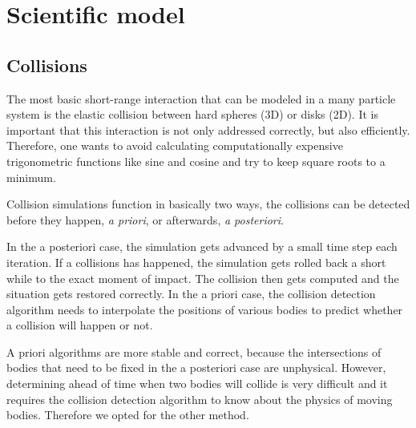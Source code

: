 \section{Scientific model}
\subsection{Collisions}

The most basic short-range interaction that can be modeled in a many 
particle system is the elastic collision between hard spheres (3D) or disks 
(2D). It is important that this interaction is not only addressed 
correctly, but also efficiently. Therefore, one wants to avoid calculating 
computationally expensive trigonometric functions like sine and cosine and 
try to keep square roots to a minimum.

Collision simulations function in basically two ways, the collisions can be 
detected before they happen, \emph{a priori}, or afterwards, \emph{a 
posteriori}.

In the a posteriori case, the simulation gets advanced by a small time step 
each iteration. If a collisions has happened, the simulation gets rolled 
back a short while to the exact moment of impact. The collision then gets 
computed and the situation gets restored correctly. In the a priori case, 
the collision detection algorithm needs to interpolate the positions of 
various bodies to predict whether a collision will happen or not.

A priori algorithms are more stable and correct, because the intersections of 
bodies that need to be fixed in the a posteriori case are unphysical. However, 
determining ahead of time when two bodies will collide is very difficult and it 
requires the collision detection algorithm to know about the physics of 
moving bodies. Therefore we opted for the other method.

